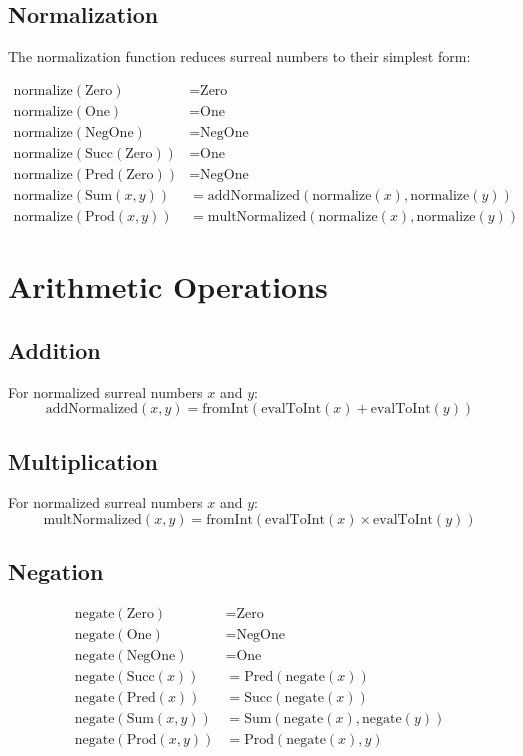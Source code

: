 \documentclass{article}
\begin{document}
\subsection{Normalization}
The normalization function reduces surreal numbers to their simplest form:

\begin{align*}
\text{normalize}(\text{Zero}) &= \text{Zero} \\
\text{normalize}(\text{One}) &= \text{One} \\
\text{normalize}(\text{NegOne}) &= \text{NegOne} \\
\text{normalize}(\text{Succ}(\text{Zero})) &= \text{One} \\
\text{normalize}(\text{Pred}(\text{Zero})) &= \text{NegOne} \\
\text{normalize}(\text{Sum}(x, y)) &= \text{addNormalized}(\text{normalize}(x), \text{normalize}(y)) \\
\text{normalize}(\text{Prod}(x, y)) &= \text{multNormalized}(\text{normalize}(x), \text{normalize}(y))
\end{align*}

\section{Arithmetic Operations}

\subsection{Addition}
For normalized surreal numbers $x$ and $y$:
\begin{equation}
\text{addNormalized}(x, y) = \text{fromInt}(\text{evalToInt}(x) + \text{evalToInt}(y))
\end{equation}

\subsection{Multiplication}
For normalized surreal numbers $x$ and $y$:
\begin{equation}
\text{multNormalized}(x, y) = \text{fromInt}(\text{evalToInt}(x) \times \text{evalToInt}(y))
\end{equation}

\subsection{Negation}
\begin{align*}
\text{negate}(\text{Zero}) &= \text{Zero} \\
\text{negate}(\text{One}) &= \text{NegOne} \\
\text{negate}(\text{NegOne}) &= \text{One} \\
\text{negate}(\text{Succ}(x)) &= \text{Pred}(\text{negate}(x)) \\
\text{negate}(\text{Pred}(x)) &= \text{Succ}(\text{negate}(x)) \\
\text{negate}(\text{Sum}(x, y)) &= \text{Sum}(\text{negate}(x), \text{negate}(y)) \\
\text{negate}(\text{Prod}(x, y)) &= \text{Prod}(\text{negate}(x), y)
\end{align*}
\end{document}
